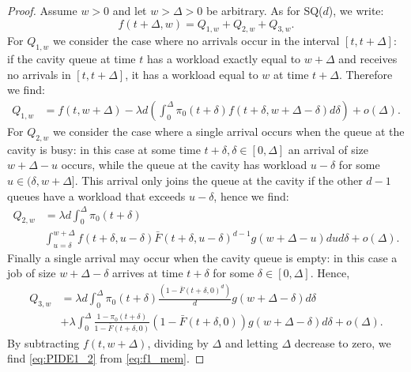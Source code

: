 \documentclass[12pt]{report}
\begin{document}
\begin{proof}
Assume $w > 0$ and let $w > \Delta > 0$ be arbitrary. As for SQ($d$), we write:
\begin{equation}\label{eq:f1_mem}
f(t+\Delta, w) = Q_{1,w} + Q_{2,w} + Q_{3,w}.
\end{equation}
For $Q_{1,w}$ we consider the case where no arrivals occur in the interval $[t,t+\Delta]$: if the cavity queue at time $t$ has a workload exactly equal to $w + \Delta$ and receives no arrivals 
in $[t,t+\Delta]$, it has a workload equal to $w$ at time $t+\Delta$. Therefore we find:
\begin{align*}
Q_{1,w} &= f(t, w + \Delta) - \lambda d \left( \int_{0}^{\Delta} \pi_0(t+\delta)
f(t+\delta,w+\Delta - \delta) d\delta \right) + o(\Delta).
\end{align*}
For $Q_{2,w}$ we consider the case where a single arrival occurs when the queue 
at the cavity is busy: in this case at some time $t+\delta, \delta \in [0,\Delta]$ an arrival of size $w+\Delta-u$ occurs, while the queue at the cavity has workload $u-\delta$ 
for some $u \in (\delta,w+\Delta]$. This arrival only joins the queue at the cavity if the
other $d-1$ queues have a workload that exceeds $u-\delta$, hence we find:
\begin{align*}
Q_{2,w} &= \lambda d  \int_{0}^{\Delta} \pi_0(t+\delta)\\
& \int_{u=\delta}^{w+\Delta} f(t+\delta, u-\delta) \bar F(t+\delta, u-\delta)^{d-1} g(w+\Delta-u)dud\delta  + o(\Delta).
\end{align*}
Finally a single arrival may occur when the cavity queue is empty: in this case a job 
of size $w + \Delta - \delta$ arrives at time $t+\delta$ for some $\delta \in [0,\Delta]$. Hence,
\begin{align*}
Q_{3,w} &= \lambda d \int_{0}^{\Delta} \pi_0(t+\delta) \frac{(1-\bar F(t+\delta,0)^d)}{d} g(w+\Delta-\delta)d\delta\\
&+\lambda \int_{0}^\Delta \frac{1-\pi_0(t+\delta)}{1-\bar F(t+\delta,0)} (1-\bar F(t+\delta,0)) g(w+\Delta-\delta) d\delta + o(\Delta).
\end{align*}
By subtracting $f(t,w+\Delta)$, dividing by $\Delta$ and letting  $\Delta$ decrease to zero, we find \eqref{eq:PIDE1_2} from \eqref{eq:f1_mem}.


\end{proof}
\end{document}

